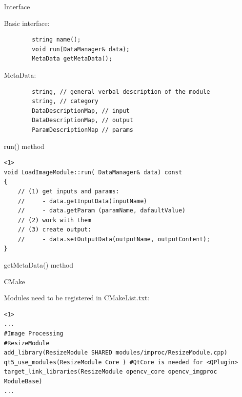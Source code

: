 \documentclass{beamer}
\begin{document}
\begin{frame}[fragile]{Interface}



	Basic interface: \newline

	\begin{lstlisting}
		string name();
		void run(DataManager& data);
		MetaData getMetaData();
	\end{lstlisting} \pause

 	MetaData: \newline

	\begin{lstlisting}
		string, // general verbal description of the module
		string, // category
		DataDescriptionMap, // input
		DataDescriptionMap, // output
		ParamDescriptionMap // params
	\end{lstlisting}



\end{frame}

\begin{frame}[fragile]{run() method}

	\begin{lstlisting}<1>
void LoadImageModule::run( DataManager& data) const
{
	// (1) get inputs and params:
	//     - data.getInputData(inputName)
	//     - data.getParam (paramName, dafaultValue)
	// (2) work with them
	// (3) create output:
	//     - data.setOutputData(outputName, outputContent);
}
	\end{lstlisting}

\end{frame}


\begin{frame}[fragile]{getMetaData() method}

\begin{linehighlight}{
}
      
\end{linehighlight}

\end{frame}


\begin{frame}[fragile]{CMake}

Modules need to be registered in CMakeList.txt: \newline

	\begin{lstlisting}<1>
...
#Image Processing
#ResizeModule
add_library(ResizeModule SHARED modules/improc/ResizeModule.cpp)
qt5_use_modules(ResizeModule Core ) #QtCore is needed for <QPlugin>
target_link_libraries(ResizeModule opencv_core opencv_imgproc ModuleBase)
...
	\end{lstlisting}



\end{frame}
\end{document}
